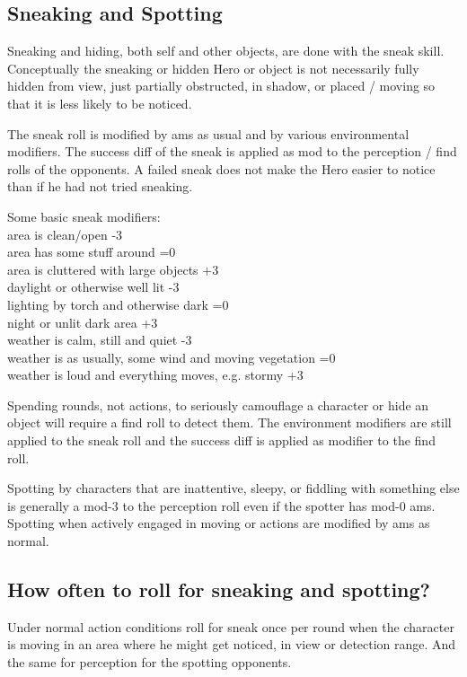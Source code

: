 \subsection*{Sneaking and Spotting}
\label{sec:sneakspot}
Sneaking and hiding, both self and other objects, are done with the sneak skill.
Conceptually the sneaking or hidden Hero or object is not necessarily fully hidden from view, just partially obstructed, in shadow, or placed / moving so that it is less likely to be noticed.

The sneak roll is modified by ams as usual and by various environmental modifiers. The success diff of the sneak is applied as mod to the perception / find rolls of the opponents. A failed sneak does not make the Hero easier to notice than if he had not tried sneaking.

Some basic sneak modifiers:\\
area is clean/open -3\\
area has some stuff around =0\\
area is cluttered with large objects +3\\
daylight or otherwise well lit -3\\
lighting by torch and otherwise dark =0\\
night or unlit dark area +3\\
weather is calm, still and quiet -3\\
weather is as usually, some wind and moving vegetation =0\\
weather is loud and everything moves, e.g. stormy  +3

Spending rounds, not actions, to seriously camouflage a character or hide an object will require a find roll to detect them. The environment modifiers are still applied to the sneak roll and the success diff is applied as modifier to the find roll.

Spotting by characters that are inattentive, sleepy, or fiddling with something else is generally a mod-3 to the perception roll even if the spotter has mod-0 ams. Spotting when actively engaged in moving or actions are modified by ams as normal.


\subsection*{How often to roll for sneaking and spotting?}
Under normal action conditions roll for sneak once per round when the character is moving in an area where he might get noticed, in view or detection range. And the same for perception for the spotting opponents.

